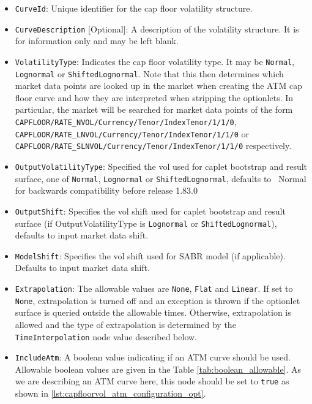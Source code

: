 \begin{itemize}
\item
\lstinline!CurveId!: Unique identifier for the cap floor volatility structure.

\item \lstinline!CurveDescription! [Optional]:
A description of the volatility structure. It is for information only and may be left blank.

\item \lstinline!VolatilityType!:
Indicates the cap floor volatility type. It may be \lstinline!Normal!, \lstinline!Lognormal! or \lstinline!ShiftedLognormal!. Note that this then determines which market data points are looked up in the market when creating the ATM cap floor curve and how they are interpreted when stripping the optionlets. In particular, the market will be searched for market data points of the form \lstinline!CAPFLOOR/RATE_NVOL/Currency/Tenor/IndexTenor/1/1/0!, \lstinline!CAPFLOOR/RATE_LNVOL/Currency/Tenor/IndexTenor/1/1/0! or \lstinline!CAPFLOOR/RATE_SLNVOL/Currency/Tenor/IndexTenor/1/1/0! respectively.

\item \lstinline!OutputVolatilityType!: Specified the vol used for caplet bootstrap and result surface, one of {\tt Normal},
  {\tt Lognormal} or {\tt ShiftedLognormal}, defaults to {\ Normal} for backwards compatibility before release 1.83.0

\item \lstinline!OutputShift!: Specifies the vol shift used for caplet bootstrap and result surface (if OutputVolatilityType is 
{\tt Lognormal} or {\tt ShiftedLognormal}), defaults to input market data shift. 

\item \lstinline!ModelShift!: Specifies the vol shift used for SABR model (if applicable). Defaults to input market data shift. 

\item \lstinline!Extrapolation!:
The allowable values are \lstinline!None!, \lstinline!Flat! and \lstinline!Linear!. If set to \lstinline!None!, extrapolation is turned off and an exception is thrown if the optionlet surface is queried outside the allowable times. Otherwise, extrapolation is allowed and the type of extrapolation is determined by the \lstinline!TimeInterpolation! node value described below.

\item \lstinline!IncludeAtm!:
A boolean value indicating if an ATM curve should be used. Allowable boolean values are given in the Table \ref{tab:boolean_allowable}. As we are describing an ATM curve here, this node should be set to \lstinline!true! as shown in \ref{lst:capfloorvol_atm_configuration_opt}.


\end{itemize}
